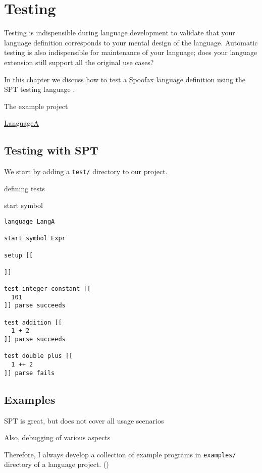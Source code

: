 \chapter{Testing}

Testing is indispensible during language development to validate that your
language definition corresponds to your mental design of the language. Automatic
testing is also indispensible for maintenance of your language; does your
language extension still support all the original use cases?

In this chapter we discuss how to test a Spoofax language definition using the
SPT testing language \cite{KatsVV11a}. 

The example project 

\href{\LanguagesRepo/LanguageA}{LanguageA}

\section{Testing with SPT}

We start by adding a \texttt{test/} directory to our project.

defining tests 

start symbol



\begin{verbatim}
language LangA

start symbol Expr

setup [[
	
]]

test integer constant [[
  101
]] parse succeeds
 
test addition [[
  1 + 2
]] parse succeeds
 
test double plus [[
  1 ++ 2
]] parse fails
\end{verbatim}


\section{Examples}

SPT is great, but does not cover all usage scenarios

Also, debugging of various aspects 

Therefore, I always develop a collection of example programs in 
\texttt{examples/} directory of a language project. ()

